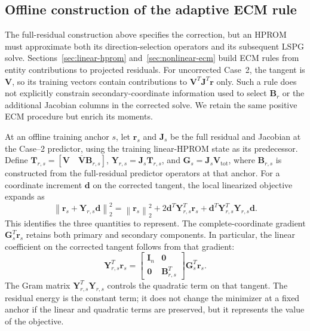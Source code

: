 \documentclass[11pt]{article}
\newcommand{\norm}[1]{\left\lVert #1 \right\rVert}
\begin{document}
\subsection{Offline construction of the adaptive ECM rule}
\label{sec:adaptive-positive-rule}
The full-residual construction above specifies the correction, but an HPROM
must approximate both its direction-selection operators and its subsequent
LSPG solve.  Sections~\ref{sec:linear-hprom} and~\ref{sec:nonlinear-ecm}
build ECM rules from entity contributions to projected residuals.  For
uncorrected Case~2, the tangent is $\mathbf V$, so its training vectors
contain contributions to $\mathbf V^T\mathbf J^T\mathbf r$ only.  Such a
rule does not explicitly constrain secondary-coordinate information used
to select $\mathbf B_r$ or the additional Jacobian columns in the corrected
solve.  We retain the same positive ECM procedure but enrich its moments.

At an offline training anchor $s$, let $\mathbf r_s$ and $\mathbf J_s$
be the full residual and Jacobian at the Case--2 predictor, using the
training linear-HPROM state as its predecessor.  Define
$\mathbf T_{r,s}=[\mathbf V\quad\overline{\mathbf V}\mathbf B_{r,s}]$,
$\mathbf Y_{r,s}=\mathbf J_s\mathbf T_{r,s}$, and
$\mathbf G_s=\mathbf J_s\mathbf V_{\mathrm{tot}}$, where
$\mathbf B_{r,s}$ is constructed from the full-residual predictor
operators at that anchor.  For a coordinate increment $\mathbf d$ on
the corrected tangent, the local linearized objective expands as
\begin{equation}
\norm{\mathbf r_s+\mathbf Y_{r,s}\mathbf d}_2^2
=\norm{\mathbf r_s}_2^2
+2\mathbf d^T\mathbf Y_{r,s}^T\mathbf r_s
+\mathbf d^T\mathbf Y_{r,s}^T\mathbf Y_{r,s}\mathbf d.
\label{eq:adaptive-anchor-objective-expansion}
\end{equation}
This identifies the three quantities to represent.  The complete-coordinate
gradient $\mathbf G_s^T\mathbf r_s$ retains both primary and secondary
components.  In particular, the linear coefficient on the corrected
tangent follows from that gradient:
\begin{equation*}
\mathbf Y_{r,s}^T\mathbf r_s=
\begin{bmatrix}
\mathbf I_n&\mathbf0\\
\mathbf0&\mathbf B_{r,s}^T
\end{bmatrix}
\mathbf G_s^T\mathbf r_s.
\end{equation*}
The Gram matrix
$\mathbf Y_{r,s}^T\mathbf Y_{r,s}$ controls the quadratic term on that
tangent.  The residual energy is the constant term; it does not change
the minimizer at a fixed anchor if the linear and quadratic terms are
preserved, but it represents the value of the objective.
\end{document}
